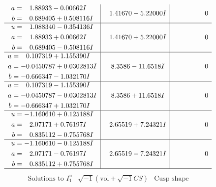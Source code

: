 \documentclass[1p]{elsarticle_modified}
\theoremstyle{definition}
\newcommand{\I}{\sqrt{-1}}
\begin{document}
$$\begin{array}{c|c|c}
\begin{aligned}
a &= \phantom{-}1.88933 - 0.00662 I \\
b &= \phantom{-}0.689405 + 0.508116 I\end{aligned}
 & \phantom{-}1.41670 - 5.22000 I & \phantom{-0.000000 } 0 \\ \hline\begin{aligned}
u &= \phantom{-}1.088340 - 0.354136 I \\
a &= \phantom{-}1.88933 + 0.00662 I \\
b &= \phantom{-}0.689405 - 0.508116 I\end{aligned}
 & \phantom{-}1.41670 + 5.22000 I & \phantom{-0.000000 } 0 \\ \hline\begin{aligned}
u &= \phantom{-}0.107319 + 1.155390 I \\
a &= -0.0450787 + 0.0302813 I \\
b &= -0.666347 - 1.032170 I\end{aligned}
 & \phantom{-}8.3586 - 11.6518 I & \phantom{-0.000000 } 0 \\ \hline\begin{aligned}
u &= \phantom{-}0.107319 - 1.155390 I \\
a &= -0.0450787 - 0.0302813 I \\
b &= -0.666347 + 1.032170 I\end{aligned}
 & \phantom{-}8.3586 + 11.6518 I & \phantom{-0.000000 } 0 \\ \hline\begin{aligned}
u &= -1.160610 + 0.125188 I \\
a &= \phantom{-}2.07171 + 0.76197 I \\
b &= \phantom{-}0.835112 - 0.755768 I\end{aligned}
 & \phantom{-}2.65519 + 7.24321 I & \phantom{-0.000000 } 0 \\ \hline\begin{aligned}
u &= -1.160610 - 0.125188 I \\
a &= \phantom{-}2.07171 - 0.76197 I \\
b &= \phantom{-}0.835112 + 0.755768 I\end{aligned}
 & \phantom{-}2.65519 - 7.24321 I & \phantom{-0.000000 } 0\\
 \hline 
 \end{array}$$\newpage$$\begin{array}{c|c|c}  
\text{Solutions to }I^u_{1}& \I (\text{vol} + \sqrt{-1}CS) & \text{Cusp shape}\\
 \hline 
\begin{aligned}

\end{aligned}
\end{array}$$
\end{document}
